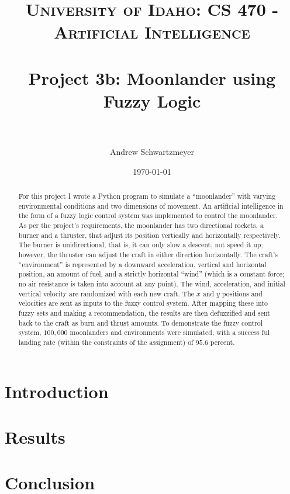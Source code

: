\documentclass[12pt, article]{scrartcl}
\title{	
\normalfont \normalsize 
\textsc{University of Idaho: CS 470 - Artificial Intelligence} \\ [25pt]
\horrule{0.5pt} \\[0.4cm]
\huge Project 3b: Moonlander using Fuzzy Logic\\
\horrule{2pt} \\[0.5cm]
}
\author{Andrew Schwartzmeyer}
\date{\normalsize\today}
\begin{document}
\maketitle 
\begin{abstract}
For this project I wrote a Python program to simulate a ``moonlander'' with varying environmental conditions and two dimensions of movement. An artificial intelligence in the form of a fuzzy logic control system was implemented to control the moonlander. As per the project's requirements, the moonlander has two directional rockets, a burner and a thruster, that adjust its position vertically and horizontally respectively. The burner is unidirectional, that is, it can only slow a descent, not speed it up; however, the thruster can adjust the craft in either direction horizontally. The craft's ``environment'' is represented by a downward acceleration, vertical and horizontal position, an amount of fuel, and a strictly horizontal ``wind'' (which is a constant force; no air resistance is taken into account at any point). The wind, acceleration, and initial vertical velocity are randomized with each new craft. The $x$ and $y$ positions and velocities are sent as inputs to the fuzzy control system. After mapping these into fuzzy sets and making a recommendation, the results are then defuzzified and sent back to the craft as burn and thrust amounts. To demonstrate the fuzzy control system, $100,000$ moonlanders and environments were simulated, with a success ful landing rate (within the constraints of the assignment) of $95.6$ percent.
\end{abstract}
\pagebreak
\section{Introduction}
\section{Results}
\section{Conclusion}
\end{document}
